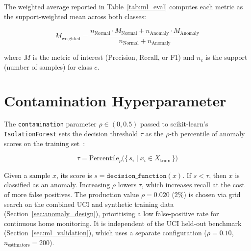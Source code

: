 The weighted average reported in Table~\ref{tab:ml_eval} computes each metric as the
support-weighted mean across both classes:

\begin{equation}
\label{eq:weighted_avg}
  M_{\text{weighted}} =
    \frac{n_{\text{Normal}} \cdot M_{\text{Normal}}
        + n_{\text{Anomaly}} \cdot M_{\text{Anomaly}}}
         {n_{\text{Normal}} + n_{\text{Anomaly}}}
\end{equation}

where $M$ is the metric of interest (Precision, Recall, or F1) and
$n_c$ is the support (number of samples) for class $c$.

\section{Contamination Hyperparameter}

The \texttt{contamination} parameter $\rho \in (0, 0.5)$ passed to
scikit-learn's \texttt{IsolationForest} sets the decision threshold
$\tau$ as the $\rho$-th percentile of anomaly scores on the training
set~\cite{Pedregosa2011}:

\begin{equation}
\label{eq:contamination}
  \tau = \text{Percentile}_{\rho}
         \bigl(\{\,s_i \mid x_i \in X_{\text{train}}\,\}\bigr)
\end{equation}

Given a sample $x$, its score is $s = \texttt{decision\_function}(x)$. If $s < \tau$, then $x$ is classified as an anomaly. Increasing $\rho$ lowers $\tau$, which increases recall at the cost of more false positives. The production value $\rho = 0.020$ (2\%) is chosen via grid search on the combined UCI and synthetic training data (Section~\ref{sec:anomaly_design}), prioritising a low false-positive rate for continuous home monitoring. It is independent of the UCI held-out benchmark (Section~\ref{sec:ml_validation}), which uses a separate configuration ($\rho = 0.10$, $n_{\text{estimators}} = 200$).


